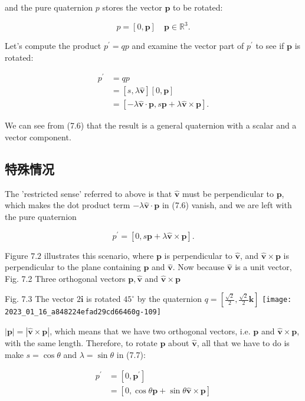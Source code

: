 and the pure quaternion $p$ stores the vector $\mathbf{p}$ to be rotated:

$$
p=[0, \mathbf{p}] \quad \mathbf{p} \in \mathbb{R}^{3} .
$$

Let's compute the product $p^{\prime}=q p$ and examine the vector part of $p^{\prime}$ to see if $\mathbf{p}$ is rotated:

$$
\begin{aligned}
p^{\prime} & =q p \\
& =[s, \lambda \hat{\mathbf{v}}][0, \mathbf{p}] \\
& =[-\lambda \hat{\mathbf{v}} \cdot \mathbf{p}, s \mathbf{p}+\lambda \hat{\mathbf{v}} \times \mathbf{p}] .
\end{aligned}
$$

We can see from (7.6) that the result is a general quaternion with a scalar and a vector component.

\subsection{特殊情况}
The 'restricted sense' referred to above is that $\hat{\mathbf{v}}$ must be perpendicular to $\mathbf{p}$, which makes the dot product term $-\lambda \hat{\mathbf{v}} \cdot \mathbf{p}$ in (7.6) vanish, and we are left with the pure quaternion

$$
p^{\prime}=[0, s \mathbf{p}+\lambda \hat{\mathbf{v}} \times \mathbf{p}] .
$$

Figure $7.2$ illustrates this scenario, where $\mathbf{p}$ is perpendicular to $\hat{\mathbf{v}}$, and $\hat{\mathbf{v}} \times \mathbf{p}$ is perpendicular to the plane containing $\mathbf{p}$ and $\hat{\mathbf{v}}$. Now because $\hat{\mathbf{v}}$ is a unit vector, Fig. 7.2 Three orthogonal vectors $\mathbf{p}, \hat{\mathbf{v}}$ and $\hat{\mathbf{v}} \times \mathbf{p}$

Fig. 7.3 The vector $2 \mathbf{i}$ is rotated $45^{\circ}$ by the quaternion $q=\left[\frac{\sqrt{2}}{2}, \frac{\sqrt{2}}{2} \mathbf{k}\right]$
\texttt{[image: 2023\_01\_16\_a848224efad29cd66460g-109]}

$|\mathbf{p}|=|\hat{\mathbf{v}} \times \mathbf{p}|$, which means that we have two orthogonal vectors, i.e. $\mathbf{p}$ and $\hat{\mathbf{v}} \times \mathbf{p}$, with the same length. Therefore, to rotate $\mathbf{p}$ about $\hat{\mathbf{v}}$, all that we have to do is make $s=\cos \theta$ and $\lambda=\sin \theta$ in (7.7):

$$
\begin{aligned}
p^{\prime} & =\left[0, \mathbf{p}^{\prime}\right] \\
& =[0, \cos \theta \mathbf{p}+\sin \theta \hat{\mathbf{v}} \times \mathbf{p}]
\end{aligned}
$$

